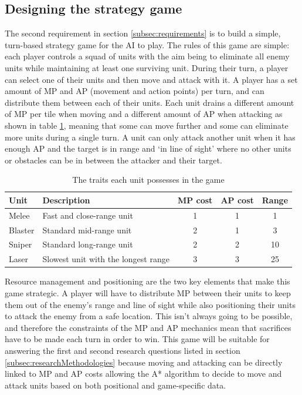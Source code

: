 \documentclass[11pt, a4paper]{report}
\begin{document}
\subsection{Designing the strategy game}
\label{subsec:designingStrategyGame}

The second requirement in section \ref{subsec:requirements} is to build a simple, turn-based strategy game for the AI to play. The rules of this game are simple: each player controls a squad of units with the aim being to eliminate all enemy units while maintaining at least one surviving unit. During their turn, a player can select one of their units and then move and attack with it. A player has a set amount of MP and AP (movement and action points) per turn, and can distribute them between each of their units. Each unit drains a different amount of MP per tile when moving and a different amount of AP when attacking as shown in table \ref{table:unitOverview}, meaning that some can move further and some can eliminate more units during a single turn. A unit can only attack another unit when it has enough AP and the target is in range and `in line of sight' where no other units or obstacles can be in between the attacker and their target.

\begin{table}[!h]
  \centering
  \begin{tabular}{ | l | p{6cm} | c | c | c |}
    \hline
    \textbf{Unit} & \textbf{Description} & \textbf{MP cost} & \textbf{AP cost} & \textbf{Range} \\ \hline
    Melee & Fast and close-range unit & 1 & 1 & 1 \\ \hline
    Blaster & Standard mid-range unit & 2 & 1 & 3 \\ \hline
    Sniper & Standard long-range unit & 2 & 2 & 10 \\ \hline
    Laser & Slowest unit with the longest range & 3 & 3 & 25 \\ 
    \hline
  \end{tabular}
  \caption{The traits each unit possesses in the game}
  \label{table:unitOverview}
\end{table}

Resource management and positioning are the two key elements that make this game strategic. A player will have to distribute MP between their units to keep them out of the enemy's range and line of sight while also positioning their units to attack the enemy from a safe location. This isn't always going to be possible, and therefore the constraints of the MP and AP mechanics mean that sacrifices have to be made each turn in order to win. This game will be suitable for answering the first and second research questions listed in section \ref{subsec:researchMethodologies} because moving and attacking can be directly linked to MP and AP costs allowing the A* algorithm to decide to move and attack units based on both positional and game-specific data.
\end{document}
